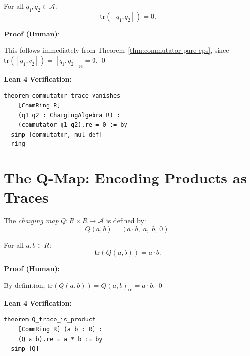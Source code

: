 \begin{theorem}
\label{thm:commutator-trace}
For all $q_1, q_2 \in \mathcal{A}$:
\[
  \mathrm{tr}([q_1, q_2]) = 0.
\]

\begin{minipage}[t]{0.48\textwidth}
\textbf{Proof (Human):}

This follows immediately from Theorem~\ref{thm:commutator-pure-eps},
since $\mathrm{tr}([q_1, q_2]) = [q_1, q_2]_{\mathrm{re}} = 0$. \qed
\end{minipage}
\hfill
\begin{minipage}[t]{0.48\textwidth}
\textbf{Lean 4 Verification:}
\begin{lstlisting}[language=lean,basicstyle=\ttfamily\scriptsize]
theorem commutator_trace_vanishes
    [CommRing R]
    (q1 q2 : ChargingAlgebra R) :
    (commutator q1 q2).re = 0 := by
  simp [commutator, mul_def]
  ring
\end{lstlisting}
\end{minipage}
\end{theorem}

\section{The Q-Map: Encoding Products as Traces}
\label{sec:q-map}

\begin{definition}
\label{def:q-map}
The \emph{charging map} $Q : R \times R \to \mathcal{A}$ is defined by:
\[
  Q(a, b) = (a \cdot b, \; a, \; b, \; 0).
\]
\end{definition}

\begin{theorem}
\label{thm:q-conservatism}
For all $a, b \in R$:
\[
  \mathrm{tr}(Q(a, b)) = a \cdot b.
\]

\begin{minipage}[t]{0.48\textwidth}
\textbf{Proof (Human):}

By definition, $\mathrm{tr}(Q(a,b)) = Q(a,b)_{\mathrm{re}} = a \cdot b$. \qed
\end{minipage}
\hfill
\begin{minipage}[t]{0.48\textwidth}
\textbf{Lean 4 Verification:}
\begin{lstlisting}[language=lean,basicstyle=\ttfamily\scriptsize]
theorem Q_trace_is_product
    [CommRing R] (a b : R) :
    (Q a b).re = a * b := by
  simp [Q]
\end{lstlisting}
\end{minipage}
\end{theorem}

